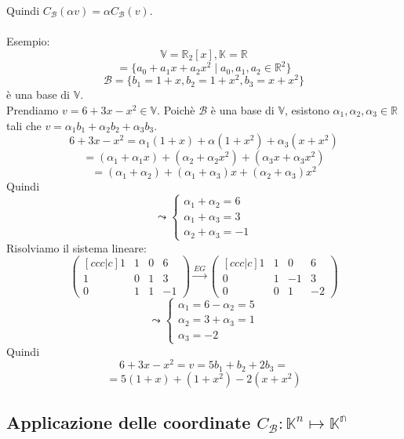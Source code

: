 \documentclass[12pt]{article}
\begin{document}
Quindi $C_{\mathcal{B}}(\alpha v) = \alpha C_{\mathcal{B}}(v)$.
\\\\
Esempio:
\[\mathbb{V} = \mathbb{R}_2[x], \mathbb{K} = \mathbb{R}\]
\[= \{a_0 + a_1x + a_2x^2 \mid a_0, a_1, a_2 \in \mathbb{R}^2\}\]
\[\mathcal{B} = \{b_1= 1+x, b_2 = 1+x^2, b_3 =x+x^2\}\]
è una base di $\mathbb{V}$.\\
Prendiamo $v = 6+3x-x^2 \in \mathbb{V}$. Poichè $\mathcal{B}$ è una base di $\mathbb{V}$, esistono $\alpha_1, \alpha_2, \alpha_3 \in \mathbb{R}$ tali che $v = \alpha_1b_1 + \alpha_2b_2 + \alpha_3b_3$.
\[6+3x-x^2 = \alpha_1(1+x) + \alpha(1+x^2) + \alpha_3(x+x^2)\]
\[= (\alpha_1 + \alpha_1x) + (\alpha_2 + \alpha_2x^2) + (\alpha_3x + \alpha_3x^2)\]
\[= (\alpha_1 + \alpha_2) + (\alpha_1 + \alpha_3)x + (\alpha_2 + \alpha_3)x^2\]
Quindi
\[\leadsto \begin{cases}
    \alpha_1 + \alpha_2 = 6\\
    \alpha_1 + \alpha_3 = 3\\
    \alpha_2 + \alpha_3 = -1
\end{cases}\]
Risolviamo il sistema lineare:
\[\begin{pmatrix}[ccc|c]
    1 & 1 & 0 & 6\\
    1 & 0 & 1 & 3\\
    0 & 1 & 1 & -1
\end{pmatrix} \stackrel{EG}{\longrightarrow} \begin{pmatrix}[ccc|c]
    1 & 1 & 0 & 6\\
    0 & 1 & -1 & 3\\
    0 & 0 & 1 & -2
\end{pmatrix}\]
\[\leadsto \begin{cases}
    \alpha_1 = 6 - \alpha_2 = 5\\
    \alpha_2 = 3 + \alpha_3 = 1\\
    \alpha_3 = -2
\end{cases}\]
Quindi
\[6 + 3x - x^ 2 = v = 5b_1 + b_2 + 2b_3 =\]  \[= 5(1+x) + (1+x^2) - 2(x+x^2)\]

\subsection{Applicazione delle coordinate $C_{\mathcal{B}}: \mathbb{K}^n \mapsto \mathbb{K^n}$}
\end{document}
